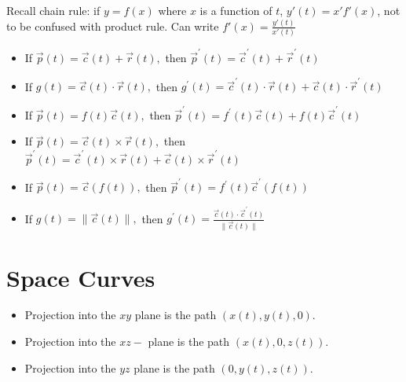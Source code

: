 Recall chain rule: if $y=f(x)$ where $x$ is a function of $t$, $y'(t)=x'f'(x)$, not to be confused with product rule.
Can write $f'(x)=\frac{y'(t)}{x'(t)}$

\begin{itemize}
    \item If $\vec{p}(t)=\vec{c}(t)+\vec{r}(t),$ then $\vec{p}^{\prime}(t)=\vec{c}^{\prime}(t)+\vec{r}^{\prime}(t)$
    \item If $g(t)=\vec{c}(t) \cdot \vec{r}(t),$ then $g^{\prime}(t)=\vec{c}^{\prime}(t) \cdot \vec{r}(t)+\vec{c}(t) \cdot \vec{r}^{\prime}(t)$
    \item If $\vec{p}(t)=f(t) \vec{c}(t),$ then $\vec{p}^{\prime}(t)=f^{\prime}(t) \vec{c}(t)+f(t) \vec{c}^{\prime}(t)$
    \item If $\vec{p}(t)=\vec{c}(t) \times \vec{r}(t),$ then $\vec{p}^{\prime}(t)=\vec{c}^{\prime}(t) \times \vec{r}(t)+\vec{c}(t) \times \vec{r}^{\prime}(t)$
    \item If $\vec{p}(t)=\vec{c}(f(t)),$ then $\vec{p}^{\prime}(t)=f^{\prime}(t) \vec{c}^{\prime}(f(t))$
    \item If $g(t)=\|\vec{c}(t)\|,$ then $g^{\prime}(t)=\frac{\vec{c}(t) \cdot \vec{c}^{\prime}(t)}{\|\vec{c}(t)\|}$
\end{itemize}

\section{Space Curves}

\begin{itemize}
    \item Projection into the $x y$ plane is the path $(x(t), y(t), 0)$.
    \item Projection into the $x z-$ plane is the path $(x(t), 0, z(t))$.
    \item Projection into the $y z$ plane is the path $(0, y(t), z(t))$.
\end{itemize}